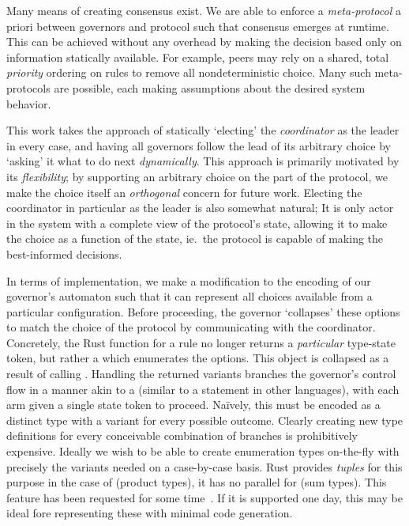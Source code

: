 Many means of creating consensus exist. We are able to enforce a \textit{meta-protocol} a priori between governors and protocol such that consensus emerges at runtime. This can be achieved without any overhead by making the decision based only on information statically available. For example, peers may rely on a shared, total \textit{priority} ordering on rules to remove all nondeterministic choice. Many such meta-protocols are possible, each making assumptions about the desired system behavior.

This work takes the approach of statically `electing' the \textit{coordinator} as the leader in every case, and having all governors follow the lead of its arbitrary choice by `asking' it what to do next \textit{dynamically}. This approach is primarily motivated by its \textit{flexibility}; by supporting an arbitrary choice on the part of the protocol, we make the choice itself an \textit{orthogonal} concern for future work. Electing the coordinator in particular as the leader is also somewhat natural; It is only actor in the system with a complete view of the protocol's state, allowing it to make the choice as a function of the state, ie.\ the protocol is capable of making the best-informed decisions.

In terms of implementation, we make a modification to the encoding of our governor's automaton such that it can represent all choices available from a particular configuration. Before proceeding, the governor `collapses' these options to match the choice of the protocol by communicating with the coordinator. Concretely, the Rust function for a rule no longer returns a \textit{particular} type-state token, but rather a  which enumerates the options. This object is collapsed as a result of calling . Handling the returned variants branches the governor's control flow in a manner akin to a  (similar to a  statement in other languages), with each arm given a single state token to proceed. Na\"ively, this must be encoded as a distinct  type with a variant for every possible outcome. Clearly creating new type definitions for every conceivable combination of branches is prohibitively expensive. Ideally we wish to be able to create enumeration types on-the-fly with precisely the variants needed on a case-by-case basis. Rust provides \textit{tuples} for this purpose in the case of  (product types), it has no parallel for  (sum types). This feature has been requested for some time~\cite{anon_sum}. If it is supported one day, this may be ideal fore representing these  with minimal code generation. 

